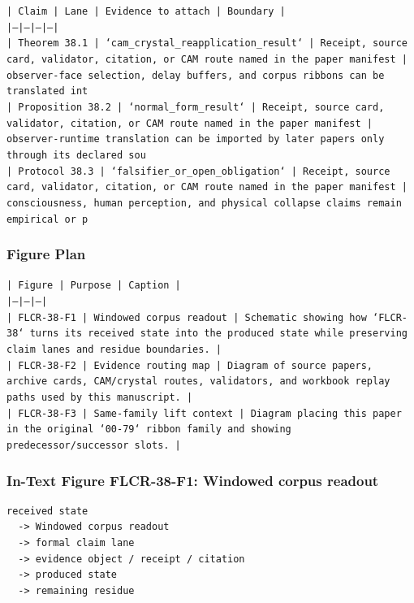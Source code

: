 \documentclass[11pt]{article}
\begin{document}
\noindent\texttt{| Claim | Lane | Evidence to attach | Boundary |}\\
\noindent\texttt{|---|---|---|---|}\\
\noindent\texttt{| Theorem 38.1 | `cam\_crystal\_reapplication\_result` | Receipt, source card, validator, citation, or CAM route named in the paper manifest | observer-face selection, delay buffers, and corpus ribbons can be translated int}\\
\noindent\texttt{| Proposition 38.2 | `normal\_form\_result` | Receipt, source card, validator, citation, or CAM route named in the paper manifest | observer-runtime translation can be imported by later papers only through its declared sou}\\
\noindent\texttt{| Protocol 38.3 | `falsifier\_or\_open\_obligation` | Receipt, source card, validator, citation, or CAM route named in the paper manifest | consciousness, human perception, and physical collapse claims remain empirical or p}\\

\subsubsection*{Figure Plan}

\noindent\texttt{| Figure | Purpose | Caption |}\\
\noindent\texttt{|---|---|---|}\\
\noindent\texttt{| FLCR-38-F1 | Windowed corpus readout | Schematic showing how `FLCR-38` turns its received state into the produced state while preserving claim lanes and residue boundaries. |}\\
\noindent\texttt{| FLCR-38-F2 | Evidence routing map | Diagram of source papers, archive cards, CAM/crystal routes, validators, and workbook replay paths used by this manuscript. |}\\
\noindent\texttt{| FLCR-38-F3 | Same-family lift context | Diagram placing this paper in the original `00-79` ribbon family and showing predecessor/successor slots. |}\\

\subsubsection*{In-Text Figure FLCR-38-F1: Windowed corpus readout}

\begin{verbatim}
received state
  -> Windowed corpus readout
  -> formal claim lane
  -> evidence object / receipt / citation
  -> produced state
  -> remaining residue
\end{verbatim}
\end{document}
